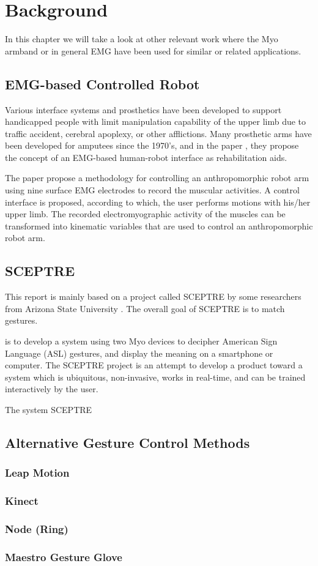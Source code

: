 \chapter{Background}
In this chapter we will take a look at other relevant work where the Myo armband or in general EMG have been used for similar or related applications.

\section{EMG-based Controlled Robot}
Various interface systems and prosthetics have been developed to support handicapped people with limit manipulation capability of the upper limb due to traffic accident, cerebral apoplexy, or other afflictions. Many prosthetic arms have been developed for amputees since the 1970’s, and in the paper \cite{fukuda1998emg}, they propose the concept of an EMG-based human-robot interface as rehabilitation aids.

The paper \cite{artemiadis2010emg} propose a methodology for controlling an anthropomorphic robot arm using nine surface EMG electrodes to record the muscular activities. A control interface is proposed, according to which, the user performs motions with his/her upper limb. The recorded electromyographic activity of the muscles can be transformed into kinematic variables that are used to control an anthropomorphic robot arm.

\section{SCEPTRE}
This report is mainly based on a project called SCEPTRE by some researchers from Arizona State University \cite{paudyal2016sceptre}. The overall goal of SCEPTRE is to match gestures.

is to develop a system using two Myo devices to decipher American Sign Language (ASL) gestures, and display the meaning on a smartphone or computer. The SCEPTRE project is an attempt to develop a product toward a system which is ubiquitous, non-invasive, works in real-time, and can be trained interactively by the user. 

The system SCEPTRE 

\section{Alternative Gesture Control Methods}
\subsection{Leap Motion}
\subsection{Kinect}
\subsection{Node (Ring)}
\subsection{Maestro Gesture Glove}
